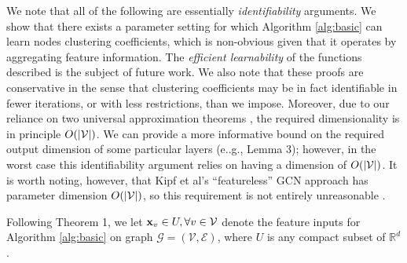 We note that all of the following are essentially {\em identifiability} arguments. 
We show that there exists a parameter setting for which Algorithm \ref{alg:basic} can learn nodes clustering coefficients, which is non-obvious given that it operates by aggregating feature information.
The {\em efficient learnability} of the functions described is the subject of future work. 
We also note that these proofs are conservative in the sense that clustering coefficients may be in fact identifiable in fewer iterations, or with less restrictions, than we impose. 
Moreover, due to our reliance on two universal approximation theorems \cite{hornik1991approximation,qi2016pointnet}, the required dimensionality is in principle $O(|\mathcal{V}|)$.
We can provide a more informative bound on the required output dimension of some particular layers (e..g., Lemma 3); however, in the worst case this identifiability argument relies on having a dimension of $O(|\mathcal{V}|)$. 
It is worth noting, however,  that Kipf et al's ``featureless'' GCN approach has parameter dimension $O(|\mathcal{V}|)$, so this requirement is not entirely unreasonable \cite{kipf2016semi,kipf2016variational}.

Following Theorem 1, we let $\mathbf{x}_v \in U, \forall v \in \mathcal{V}$ denote the feature inputs for Algorithm \ref{alg:basic} on graph $\mathcal{G}=(\mathcal{V}, \mathcal{E})$, where $U$ is any compact subset of $\mathbb{R}^d$.

